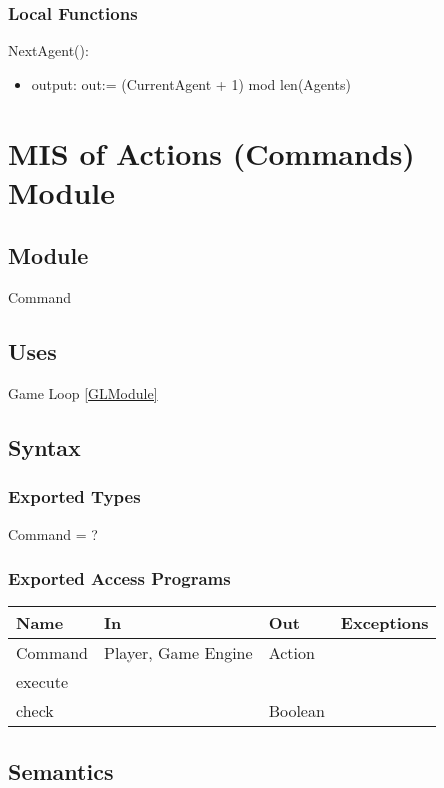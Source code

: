 \documentclass[12pt, titlepage]{article}
\begin{document}
\subsubsection{Local Functions}
\noindent NextAgent():
\begin{itemize}
\item output: out:= (CurrentAgent + 1) mod len(Agents)
\end{itemize}

\newpage
\section{MIS of Actions (Commands) Module} \label{ActionModule} 
\subsection{Module}
Command

\subsection{Uses}
Game Loop \ref{GLModule}

\subsection{Syntax}

\subsubsection{Exported Types}
Command = ?

\subsubsection{Exported Access Programs}

\begin{tabular}{p{2cm} p{4cm} p{4cm} p{5cm}}
\hline
\textbf{Name} & \textbf{In} & \textbf{Out} & \textbf{Exceptions} \\
\hline
Command & Player, Game Engine & Action &  \\
execute & & & \\
check & &Boolean & \\
\hline
\end{tabular}

\subsection{Semantics}
\end{document}
